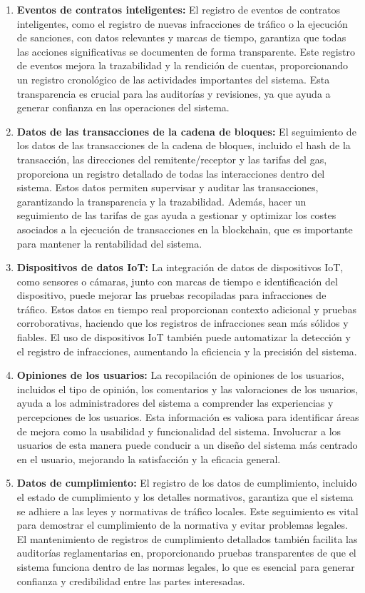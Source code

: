 \begin{enumerate}
        \item \textbf{Eventos de contratos inteligentes:} El registro de eventos de contratos inteligentes, como el registro de nuevas infracciones de tráfico o la ejecución de sanciones, con datos relevantes y marcas de tiempo, garantiza que todas las acciones significativas se documenten de forma transparente. Este registro de eventos mejora la trazabilidad y la rendición de cuentas, proporcionando un registro cronológico de las actividades importantes del sistema. Esta transparencia es crucial para las auditorías y revisiones, ya que ayuda a generar confianza en las operaciones del sistema. 
        \item \textbf{Datos de las transacciones de la cadena de bloques: } El seguimiento de los datos de las transacciones de la cadena de bloques, incluido el hash de la transacción, las direcciones del remitente/receptor y las tarifas del gas, proporciona un registro detallado de todas las interacciones dentro del sistema. Estos datos permiten supervisar y auditar las transacciones, garantizando la transparencia y la trazabilidad. Además, hacer un seguimiento de las tarifas de gas ayuda a gestionar y optimizar los costes asociados a la ejecución de transacciones en la blockchain, que es importante para mantener la rentabilidad del sistema. 
        \item \textbf{Dispositivos de datos IoT:} La integración de datos de dispositivos IoT, como sensores o cámaras, junto con marcas de tiempo e identificación del dispositivo, puede mejorar las pruebas recopiladas para infracciones de tráfico. Estos datos en tiempo real proporcionan contexto adicional y pruebas corroborativas, haciendo que los registros de infracciones sean más sólidos y fiables. El uso de dispositivos IoT también puede automatizar la detección y el registro de infracciones, aumentando la eficiencia y la precisión del sistema.
            \item \textbf{Opiniones de los usuarios: } La recopilación de opiniones de los usuarios, incluidos el tipo de opinión, los comentarios y las valoraciones de los usuarios, ayuda a los administradores del sistema a comprender las experiencias y percepciones de los usuarios. Esta información es valiosa para identificar áreas de mejora como la usabilidad y funcionalidad del sistema. Involucrar a los usuarios de esta manera puede conducir a un diseño del sistema más centrado en el usuario, mejorando la satisfacción y la eficacia general. 
                \item \textbf{Datos de cumplimiento: } El registro de los datos de cumplimiento, incluido el estado de cumplimiento y los detalles normativos, garantiza que el sistema se adhiere a las leyes y normativas de tráfico locales. Este seguimiento es vital para demostrar el cumplimiento de la normativa y evitar problemas legales. El mantenimiento de registros de cumplimiento detallados también facilita las auditorías reglamentarias en, proporcionando pruebas transparentes de que el sistema funciona dentro de las normas legales, lo que es esencial para generar confianza y credibilidad entre las partes interesadas.
\end{enumerate}
